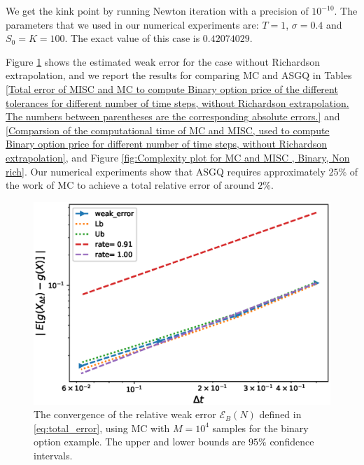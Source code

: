We get the kink point by running Newton iteration with a precision of $10^{-10}$. The parameters that we used in our numerical experiments are: $T=1$, $\sigma=0.4$ and $S_0=K=100$. The exact value of this case is $0.42074029$.

Figure \ref{fig:Weak_rate_binary} shows the estimated   weak error  for the case without Richardson extrapolation, and we report the results for comparing MC and ASGQ in Tables \ref{Total error of MISC and MC to compute Binary option price of the different tolerances for different number of time steps, without Richardson extrapolation. The numbers between parentheses are the corresponding absolute errors.} and \ref{Comparsion of the computational time of  MC and MISC, used to compute Binary option price  for different number of time steps, without Richardson extrapolation}, and Figure \ref{fig:Complexity plot for MC and MISC , Binary, Non rich}. Our numerical experiments show that ASGQ  requires approximately $25\%$ of the work of MC  to achieve a total relative error of around $2\%$.

\FloatBarrier
\begin{figure}[h!]
		\centering
		\includegraphics[width=0.4\linewidth]{./figures/binary_weak_error/without_richardson/weak_convergence_order_binary_option_relative_M_10_4}
	
	\caption{The convergence of the relative weak error  $\mathcal{E}_B(N)$ defined in \ref{eq:total_error}, using MC with $M=10^4$ samples  for the binary option example. The upper and lower bounds are $95\%$ confidence intervals.}
	\label{fig:Weak_rate_binary}
\end{figure}

